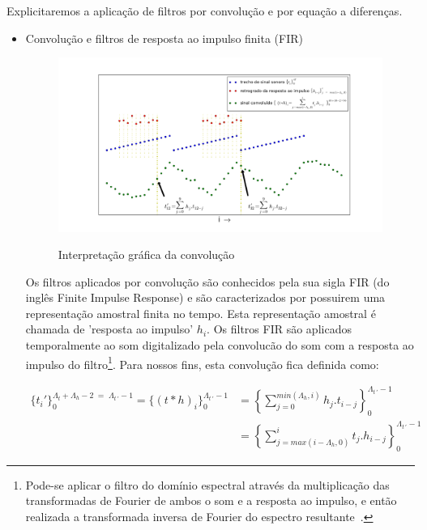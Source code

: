 Explicitaremos a aplicação de filtros por convolução
e por equação a diferenças.

\begin{itemize}

\item  Convolução e filtros de resposta ao impulso finita (FIR)

\begin{figure}[h!]
    \centering
    \caption{Interpretação gráfica da convolução}
        \includegraphics[width=\textwidth]{figuras/convolucao______}
        \label{fig:conv}
\end{figure}

Os filtros aplicados por convolução são conhecidos
pela sua sigla FIR (do inglês Finite Impulse Response)
e são caracterizados por possuirem uma representação amostral
finita no tempo. Esta representação amostral é chamada
de 'resposta ao impulso' $h_i$. Os filtros FIR são aplicados temporalmente ao som
digitalizado pela convolucão do som com a 
resposta ao impulso do filtro\footnote{Pode-se aplicar o filtro do domínio espectral através da multiplicação das transformadas de Fourier de ambos o som e a resposta ao impulso, e então realizada a transformada inversa de Fourier do espectro resultante~\cite{Openheim}.}. Para nossos fins, esta
convolução fica definida como:

\begin{equation}\label{eq:conv}
\begin{split}
\{t_i'\}_0^{\Lambda_t+\Lambda_h-2\; = \;\Lambda_{t\, '}-1} =\{(t*h)_i\}_0^{\Lambda_{t \, '}-1} & =\left \{ \sum_{j=0}^{min(\Lambda_h,i)}h_{j} . t_{i-j} \right \}_0^{\Lambda_{t\, '}-1} \\
    & =\left \{ \sum_{j=max(i-\Lambda_h,0)}^{i}t_j . h_{i-j} \right \}_0^{\Lambda_{t\, '}-1}
\end{split}
\end{equation}


\end{itemize}
